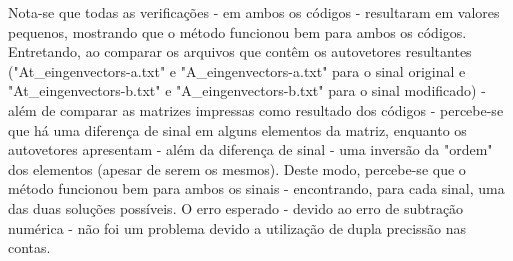 \documentclass[12pt, a4paper]{article} %
\begin{document}
        Nota-se que todas as verifica\c{c}\~oes - em ambos os c\'odigos - resultaram em valores pequenos, mostrando que o m\'etodo funcionou bem para ambos os c\'odigos.
        Entretando, ao comparar os arquivos que cont\^em os autovetores resultantes ("At\_eingenvectors-a.txt" e "A\_eingenvectors-a.txt" para o sinal original e "At\_eingenvectors-b.txt" e "A\_eingenvectors-b.txt" para o sinal modificado) - al\'em de comparar as matrizes impressas como resultado dos c\'odigos -  percebe-se que há uma diferen\c{c}a de sinal em alguns elementos da matriz, enquanto os autovetores apresentam - al\'em da diferen\c{c}a de sinal - uma invers\~ao da "ordem" dos elementos (apesar de serem os mesmos).
        Deste modo, percebe-se que o m\'etodo funcionou bem para ambos os sinais - encontrando, para cada sinal, uma das duas solu\c{c}\~oes poss\'iveis. O erro esperado - devido ao erro de subtra\c{c}\~ao num\'erica - n\~ao foi um problema devido a utiliza\c{c}\~ao de dupla preciss\~ao nas contas.
\end{document}
